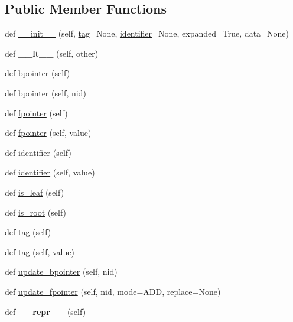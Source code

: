 \subsection*{Public Member Functions}
\begin{DoxyCompactItemize}
\item 
def \mbox{\hyperlink{classtreelib_1_1node_1_1Node_a40dc94dc2ce16b607bf735acb320d7bb}{\+\_\+\+\_\+init\+\_\+\+\_\+}} (self, \mbox{\hyperlink{classtreelib_1_1node_1_1Node_a68ca07ba126979d83543f213e7f52c3e}{tag}}=None, \mbox{\hyperlink{classtreelib_1_1node_1_1Node_a6dbeb05446904d2febeaa4d20abb31a1}{identifier}}=None, expanded=True, data=None)
\item 
\mbox{\label{classtreelib_1_1node_1_1Node_aa1a167121d30df7234ed59e6fd7c96bb}} 
def {\bfseries \+\_\+\+\_\+lt\+\_\+\+\_\+} (self, other)
\item 
def \mbox{\hyperlink{classtreelib_1_1node_1_1Node_a3def6abc955f79c98da7688fa6081bc9}{bpointer}} (self)
\item 
def \mbox{\hyperlink{classtreelib_1_1node_1_1Node_aaedc8fc3db46b17bb479cb69ad66608d}{bpointer}} (self, nid)
\item 
def \mbox{\hyperlink{classtreelib_1_1node_1_1Node_ad2b9f57da01153752895e27d5d2c144e}{fpointer}} (self)
\item 
def \mbox{\hyperlink{classtreelib_1_1node_1_1Node_acb2cb3505fd3c75bd6cd06712a03641c}{fpointer}} (self, value)
\item 
def \mbox{\hyperlink{classtreelib_1_1node_1_1Node_a6dbeb05446904d2febeaa4d20abb31a1}{identifier}} (self)
\item 
def \mbox{\hyperlink{classtreelib_1_1node_1_1Node_a58699f5036c8c84bcf2d24d7b9814ed3}{identifier}} (self, value)
\item 
def \mbox{\hyperlink{classtreelib_1_1node_1_1Node_a5b2ad2036d768dbb741791f57c703ab3}{is\+\_\+leaf}} (self)
\item 
def \mbox{\hyperlink{classtreelib_1_1node_1_1Node_a472326830ef0cac5c3af06058128b96a}{is\+\_\+root}} (self)
\item 
def \mbox{\hyperlink{classtreelib_1_1node_1_1Node_a68ca07ba126979d83543f213e7f52c3e}{tag}} (self)
\item 
def \mbox{\hyperlink{classtreelib_1_1node_1_1Node_a467000d0a2e363fb0103d68bcda6523e}{tag}} (self, value)
\item 
def \mbox{\hyperlink{classtreelib_1_1node_1_1Node_a7901e3be6d17854d393a389661287826}{update\+\_\+bpointer}} (self, nid)
\item 
def \mbox{\hyperlink{classtreelib_1_1node_1_1Node_a825ebfd2390ea553a95d0fa6985087d3}{update\+\_\+fpointer}} (self, nid, mode=A\+DD, replace=None)
\item 
\mbox{\label{classtreelib_1_1node_1_1Node_a721477220f691e58cf8fe7cb8a92ef39}} 
def {\bfseries \+\_\+\+\_\+repr\+\_\+\+\_\+} (self)
\end{DoxyCompactItemize}
